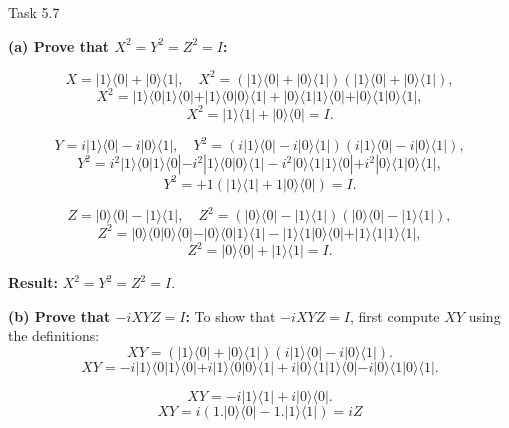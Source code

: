\documentclass[aspectratio=169]{beamer}
\begin{document}
\begin{frame}{Task 5.7}

{\tiny

\textbf{(a) Prove that \(X^2 = Y^2 = Z^2 = I\):}

\[
X = |1\rangle\langle0| + |0\rangle\langle1|, \quad
X^2 = (|1\rangle\langle0| + |0\rangle\langle1|)(|1\rangle\langle0| + |0\rangle\langle1|),
\]
\[
X^2 = |1\rangle\langle0|1\rangle\langle0| + |1\rangle\langle0|0\rangle\langle1| + |0\rangle\langle1|1\rangle\langle0| + |0\rangle\langle1|0\rangle\langle1|,
\]
\[
X^2 = |1\rangle\langle1| + |0\rangle\langle0| = I.
\]

\[
Y = i|1\rangle\langle0| - i|0\rangle\langle1|, \quad
Y^2 = (i|1\rangle\langle0| - i|0\rangle\langle1|)(i|1\rangle\langle0| - i|0\rangle\langle1|),
\]
\[
Y^2 = i^2|1\rangle\langle0|1\rangle\langle0| - i^2|1\rangle\langle0|0\rangle\langle1| - i^2|0\rangle\langle1|1\rangle\langle0| + i^2|0\rangle\langle1|0\rangle\langle1|,
\]
\[
Y^2 = +1(|1\rangle\langle1| + 1|0\rangle\langle0|) = I.
\]

\[
Z = |0\rangle\langle0| - |1\rangle\langle1|, \quad
Z^2 = (|0\rangle\langle0| - |1\rangle\langle1|)(|0\rangle\langle0| - |1\rangle\langle1|),
\]
\[
Z^2 = |0\rangle\langle0|0\rangle\langle0| - |0\rangle\langle0|1\rangle\langle1| - |1\rangle\langle1|0\rangle\langle0| + |1\rangle\langle1|1\rangle\langle1|,
\]
\[
Z^2 = |0\rangle\langle0| + |1\rangle\langle1| = I.
\]

\textbf{Result:} \(X^2 = Y^2 = Z^2 = I.\)

\vspace{0.3cm}

\textbf{(b) Prove that \(-iXYZ = I\):}
To show that \(-iXYZ = I\), first compute \(XY\) using the definitions:
\[
XY = (|1\rangle\langle0| + |0\rangle\langle1|)(i|1\rangle\langle0| - i|0\rangle\langle1|).
\]
\[
XY = -i|1\rangle\langle0|1\rangle\langle0| + i|1\rangle\langle0|0\rangle\langle1| + i|0\rangle\langle1|1\rangle\langle0| - i|0\rangle\langle1|0\rangle\langle1|.
\]

\[
XY = -i|1\rangle\langle1| + i|0\rangle\langle0|.
\]
\[
XY = i(1.|0\rangle\langle0| - 1.|1\rangle\langle1|) = iZ
\]

}

\end{frame}
\end{document}
